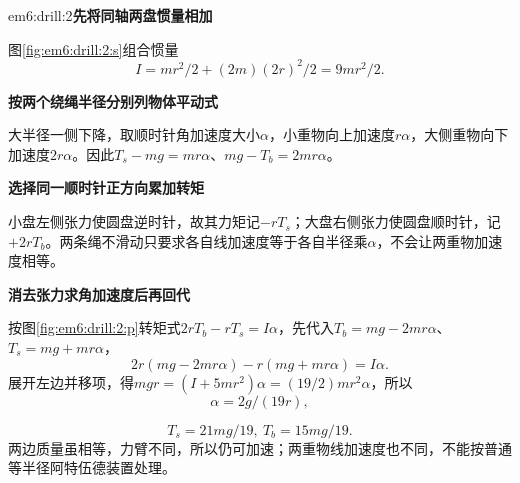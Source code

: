 \begin{drillsolution}{em6:drill:2}\textbf{先将同轴两盘惯量相加}\par\nobreak
图\ref{fig:em6:drill:2:s}组合惯量
\[I=mr^2/2+(2m)(2r)^2/2=\boxed{9mr^2/2}.\]


\par\medskip{}\noindent\textbf{按两个绕绳半径分别列物体平动式}\par\nobreak
大半径一侧下降，取顺时针角加速度大小$\alpha$，小重物向上加速度$r\alpha$，大侧重物向下加速度$2r\alpha$。因此$T_s-mg=mr\alpha$、$mg-T_b=2mr\alpha$。



\par\medskip{}\noindent\textbf{选择同一顺时针正方向累加转矩}\par\nobreak
小盘左侧张力使圆盘逆时针，故其力矩记$-rT_s$；大盘右侧张力使圆盘顺时针，记$+2rT_b$。两条绳不滑动只要求各自线加速度等于各自半径乘$\alpha$，不会让两重物加速度相等。



\par\medskip{}\noindent\textbf{消去张力求角加速度后再回代}\par\nobreak
按图\ref{fig:em6:drill:2:p}转矩式$2rT_b-rT_s=I\alpha$，先代入$T_b=mg-2mr\alpha$、$T_s=mg+mr\alpha$，
\[
2r(mg-2mr\alpha)-r(mg+mr\alpha)=I\alpha.
\]
展开左边并移项，得$mgr=(I+5mr^2)\alpha=(19/2)mr^2\alpha$，所以
\[\boxed{\alpha=2g/(19r)},\]

\[\boxed{T_s=21mg/19,\ T_b=15mg/19}.\]
两边质量虽相等，力臂不同，所以仍可加速；两重物线加速度也不同，不能按普通等半径阿特伍德装置处理。\end{drillsolution}
